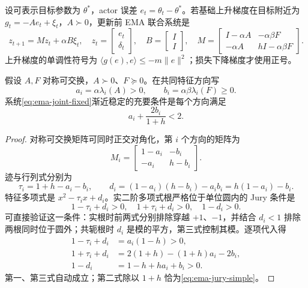 设可表示目标参数为 $\theta^*$，actor 误差 $e_t=\theta_t-\theta^*$。若基础上升梯度在目标附近为 $g_t=-Ae_t+\xi_t$，$A\succ0$，更新前 EMA 联合系统是
\begin{equation}
 z_{t+1}=Mz_t+\alpha B\xi_t,
 \quad z_t=\begin{bmatrix}e_t\\\delta_t\end{bmatrix},\quad
 B=\begin{bmatrix}I\\I\end{bmatrix},\quad
 M=\begin{bmatrix}I-\alpha A&-\alpha\beta F\\
                  -\alpha A&hI-\alpha\beta F\end{bmatrix}.
 \label{eq:ema-joint-fixed}
\end{equation}
上升梯度的单调性符号为 $\langle g(e),e\rangle\le-m\|e\|^2$；损失下降梯度才使用正号。

\begin{theorem}
\label{thm:ema-jury}
假设 $A,F$ 对称可交换，$A\succ0$、$F\succeq0$。在共同特征方向写
\[
 a_i=\alpha\lambda_i(A)>0,\qquad b_i=\alpha\beta\lambda_i(F)\ge0.
\]
系统\eqref{eq:ema-joint-fixed}渐近稳定的充要条件是每个方向满足
\begin{equation}
 a_i+\frac{2b_i}{1+h}<2.
 \label{eq:ema-jury-simple}
\end{equation}
\end{theorem}
\begin{proof}
对称可交换矩阵可同时正交对角化，第 $i$ 个方向的矩阵为
\[
 M_i=\begin{bmatrix}1-a_i&-b_i\\-a_i&h-b_i\end{bmatrix}.
\]
迹与行列式分别为
\[
 \tau_i=1+h-a_i-b_i,\qquad
 d_i=(1-a_i)(h-b_i)-a_ib_i=h(1-a_i)-b_i.
\]
特征多项式是 $x^2-\tau_ix+d_i$。实二阶多项式根严格位于单位圆内的 Jury 条件是
\[
 1-\tau_i+d_i>0,\quad1+\tau_i+d_i>0,\quad1-d_i>0.
\]
可直接验证这一条件：实根时前两式分别排除穿越 $+1$、$-1$，并结合 $d_i<1$ 排除两根同时位于圆外；共轭根时 $d_i$ 是模的平方，第三式控制其模。逐项代入得
\begin{align*}
 1-\tau_i+d_i&=a_i(1-h)>0,\\
 1+\tau_i+d_i&=2(1+h)-(1+h)a_i-2b_i,\\
 1-d_i&=1-h+ha_i+b_i>0.
\end{align*}
第一、第三式自动成立；第二式除以 $1+h$ 恰为\eqref{eq:ema-jury-simple}。
\end{proof}

